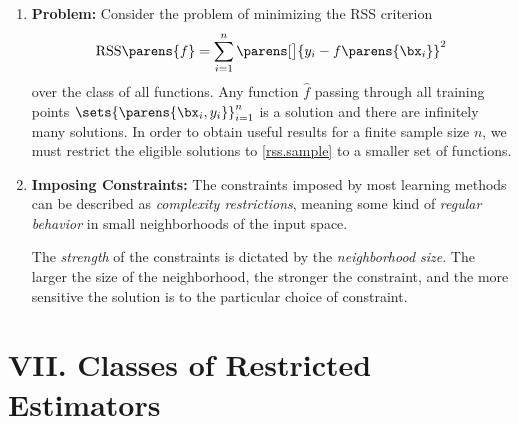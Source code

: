 \documentclass[12pt]{article}
\begin{document}
\begin{enumerate}[label=\textbf{\arabic*.}]

	\item \textbf{Problem:} Consider the problem of minimizing the RSS criterion 
	\begin{align}\label{rss.sample}
		\mathrm{RSS} \parens{f} = \sum_{i=1}^n \parens[\big]{y_i - f \parens{\bx_i}}^2
	\end{align}
	over the class of all functions. Any function $\hat{f}$ passing through all training points $\sets{\parens{\bx_i, y_i}}_{i=1}^n$ is a solution and there are infinitely many solutions. In order to obtain useful results for a finite sample size $n$, we must restrict the eligible solutions to \eqref{rss.sample} to a smaller set of functions. 

	\item \textbf{Imposing Constraints:} The constraints imposed by most learning methods can be described as \textit{complexity restrictions}, meaning some kind of \textit{regular behavior} in small neighborhoods of the input space. 

	The \textit{strength} of the constraints is dictated by the \textit{neighborhood size}. The larger the size of the neighborhood, the stronger the constraint, and the more sensitive the solution is to the particular choice of constraint. 
\end{enumerate}

\section*{VII. Classes of Restricted Estimators}
\end{document}
